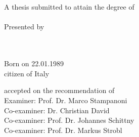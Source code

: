 \begin{titlepage}
    \begin{addmargin}[-1cm]{-3cm}
    \begin{center}
        \large

        \hfill

        \vfill

        \\ \bigskip
        \begingroup
            \color{Maroon}\spacedallcaps{\myTitle} \\ \bigskip
        \endgroup

        A thesis submitted to attain the degree of \\
         \\ \bigskip
        Presented by\\
        \spacedlowsmallcaps{\myName} \\ \bigskip

        \myDegree \\
        Born on 22.01.1989 \\
        citizen of Italy\\ \bigskip

        accepted on the recommendation of\\
        Examiner: Prof. Dr. Marco Stampanoni\\
        Co-examiner: Dr. Christian David\\
        Co-examiner: Prof. Dr. Johannes Schittny\\
        Co-examiner:  Prof. Dr. Markus Strobl\\

        \vfill



        \myTime

        \vfill

    \end{center}
  \end{addmargin}
\end{titlepage}
